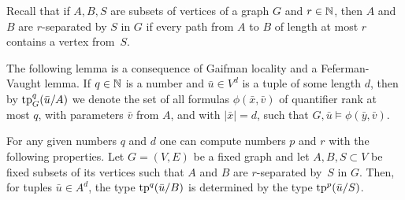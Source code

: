 Recall that if $A,B,S$ are subsets of vertices of a graph $G$ and $r\in\mathbb{N}$,
then $A$ and $B$ are $r$-separated by $S$ in $G$
if every path from $A$ to $B$ of length at most $r$ contains a vertex from~$S$.

\medskip
The following lemma is a consequence of Gaifman locality and a Feferman-Vaught lemma. If $q\in \mathbb{N}$ is a number and $\bar u\in  V^{d}$
is a tuple of some length $d$, then by $\mathrm{tp}^q_G(\bar u/A)$  we denote the set of all formulas $\phi(\bar x,\bar v)$
of quantifier rank at most $q$, with parameters $\bar v$ from $A$, and with $|\bar x|=d$,
such that $G,\bar u\models \phi(\bar y,\bar v)$.

\begin{lemma}[$\star$]\label{lem:types}
For any given numbers $q$ and $d$
one can compute numbers $p$ and $r$ with the following properties.
Let $G=(V,E)$ be a fixed graph and let $A,B,S\subset V$ be fixed subsets of its vertices
such that $A$ and $B$ are $r$-separated by~$S$ in $G$.
Then, for tuples $\bar u\in A^{d}$, the type $\mathrm{tp}^q(\bar u/B)$ is determined by the type $\mathrm{tp}^{p}(\bar u/S)$.
\end{lemma}

